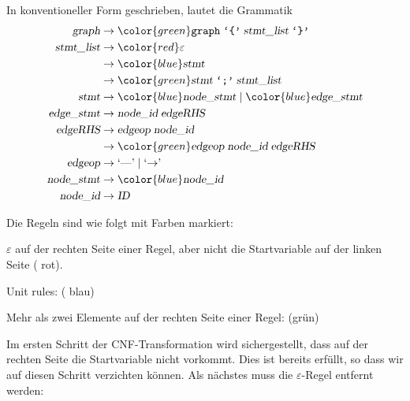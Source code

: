 \begin{loesung}
\begin{teilaufgaben}
\item In konventioneller Form geschrieben, lautet die Grammatik
\begin{align*}
\textsl{graph}     &\rightarrow {\color{green}\texttt{graph}\; \texttt{`\{'}\; \textsl{stmt\_list}\; \texttt{`\}'}} \\
\textsl{stmt\_list}&\rightarrow {\color{red}\varepsilon}\\
                   &\rightarrow {\color{blue}\textsl{stmt}}\\
                   &\rightarrow {\color{green}\textsl{stmt}\; \texttt{`;'}\; \textsl{stmt\_list}}\\
\textsl{stmt}      &\rightarrow {\color{blue}\textsl{node\_stmt}}\; |\;
                                {\color{blue}\textsl{edge\_stmt}} \\
\textsl{edge\_stmt}&\rightarrow \textsl{node\_id}\; \textsl{edgeRHS} \\
\textsl{edgeRHS}   &\rightarrow \textsl{edgeop}\; \textsl{node\_id}\\
                   &\rightarrow {\color{green}\textsl{edgeop}\; \textsl{node\_id}\; \textsl{edgeRHS}}\\
\textsl{edgeop}    &\rightarrow \textrm{`\text{---}'}\; |\; \textrm{`$\rightarrow$'}\; \\
\textsl{node\_stmt}&\rightarrow {\color{blue}\textsl{node\_id}} \\
\textsl{node\_id}  &\rightarrow {\textsl{ID}}
\end{align*}
\item Die Regeln sind wie folgt mit Farben markiert:
\begin{compactenum}
\item $\varepsilon$ auf der rechten Seite einer Regel, aber nicht die
Startvariable auf der linken Seite ({\color{red} rot}).
\item Unit rules: ({\color{blue} blau})
\item Mehr als zwei Elemente auf der rechten Seite einer Regel:
({\color{green}grün})
\end{compactenum}
\item Im ersten Schritt der CNF-Transformation wird sichergestellt, dass
auf der rechten Seite die Startvariable nicht vorkommt.
Dies ist bereits erfüllt, so dass wir auf diesen Schritt verzichten können.
Als nächstes muss die $\varepsilon$-Regel entfernt werden:
\begin{align*}

\end{align*}
\end{teilaufgaben}
\end{loesung}
